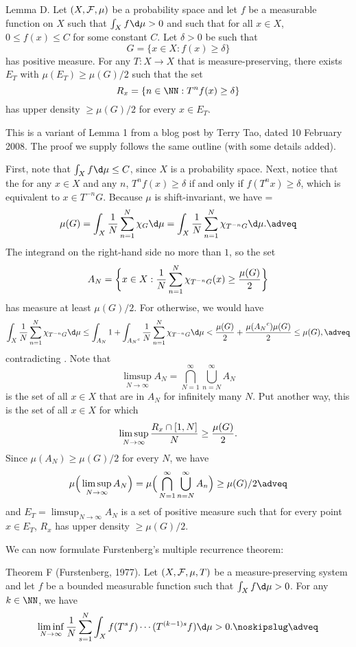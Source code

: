 \proclaim Lemma D. Let $(X,{\cal F},\mu)$ be a probability space and let $f$ be a measurable function on $X$
such that $\int_Xf\d\mu>0$ and such that for all $x\in X$, $0\leq f(x)\leq C$ for some constant $C$.
Let $\delta>0$ be such that
$$G = \{x\in X : f(x)\geq \delta\}$$
has positive measure. For any $T:X\to X$ that is measure-preserving,
there exists $E_T$ with $\mu(E_T)\geq \mu(G)/2$ such that the set
$$R_x = \{n\in \NN : T^nf(x) \geq \delta\}$$
has upper density $\geq \mu(G)/2$ for every $x\in E_T$.

\noindent This is a variant of Lemma 1 from a blog post by Terry Tao, dated 10 February 2008. The
proof we supply follows the same outline (with some details added).

\proof First, note that $\int_Xf\d\mu\leq C$, since $X$ is a probability space. Next, notice that
the for any $x\in X$ and any $n$, $T^nf(x)\geq \delta$ if and only if $f(T^nx)\geq \delta$,
which is equivalent to
$x\in T^{-n}G$. Because $\mu$ is shift-invariant, we have
\newcount\eqA
\eqA=\eqcount
$$\mu(G) = \int_X {1\over N} \sum_{n=1}^N \chi_{G}\d\mu = \int_X{1\over N}\sum_{n=1}^N \chi_{T^{-n}G}\d\mu.\adveq$$
The integrand on the right-hand side no more than $1$, so the set
$$A_N = \bigg\{ x\in X : {1\over N} \sum_{n=1}^N \chi_{T^{-n}G}(x)\geq {\mu(G)\over 2} \bigg\}$$
has measure at least $\mu(G)/2$. For otherwise, we would have
$$\int_X {1\over N}\sum_{n=1}^N \chi_{T^{-n}G}\d\mu \leq \int_{A_N} 1
  + \int_{{A_N}^c} {1\over N}\sum_{n=1}^N \chi_{T^{-n}G}\d\mu < {\mu(G)\over 2} + {\mu({A_N}^c)\mu(G)\over 2}
  \leq\mu(G),\adveq$$
contradicting . Note that
$$\limsup_{N\to\infty} A_N = \bigcap_{N=1}^\infty \bigcup_{n=N}^\infty A_N$$
is the set of all $x\in X$ that are in $A_N$ for infinitely many $N$. Put another way, this is the set
of all $x\in X$ for which
$$\limsup_{N\to\infty} {R_x \cap [1,N]\over N} \geq {\mu(G)\over 2}.$$
Since $\mu(A_N)\geq \mu(G)/2$ for every $N$, we have
$$\mu\Big(\limsup_{N\to\infty} A_N\Big) = \mu\Big(\bigcap_{N=1}^\infty \bigcup_{n=N}^\infty A_n\Big)\geq
\mu(G)/2\adveq$$
and $E_T = \limsup_{N\to\infty} A_N$ is a set of positive measure such that for every point $x\in E_T$,
$R_x$ has upper density $\geq \mu(G)/2$.\slug

\noindent We can now formulate Furstenberg's multiple recurrence theorem:

\parenproclaim Theorem F (Furstenberg, {\rm 1977}). Let $(X,{\cal F},\mu,T)$ be a measure-preserving
system and let $f$ be a bounded measurable function such that $\int_X f\d\mu >0$. For any $k\in \NN$, we have
$$\liminf_{N\to\infty} {1\over N} \sum_{s=1}^N \int_X f (T^sf)\cdots (T^{(k-1)s}f)\d\mu>0.\noskipslug\adveq$$

